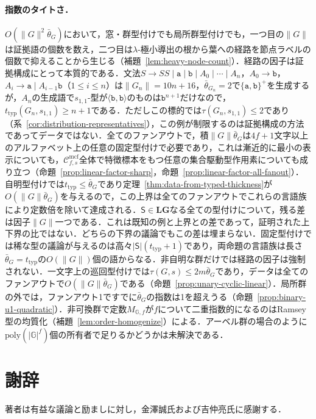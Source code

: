 \documentclass[11pt,a4paper]{ltjsarticle}
\numberwithin{equation}{section}
\theoremstyle{plain}
\theoremstyle{definition}
\theoremstyle{remark}
\newcommand{\Cmcf}[2]{\mathcal{C}^{\mathrm{mcf}}_{#1,#2}}
\begin{document}
\paragraph{指数のタイトさ．}
$O(\|G\|^2\bar\theta_G)$において，窓・群型付けでも局所群型付けでも，一つ目の$\|G\|$は証拠語の個数を数え，二つ目は$\lambda$-極小導出の根から葉への経路を節点ラベルの個数で抑えることから生じる（補題~\ref{lem:heavy-node-count}）．経路の因子は証拠構成にとって本質的である．文法$S\to SS\mid\mathtt a\mid\mathtt b\mid A_0\mid\cdots\mid A_n$，$A_0\to\mathtt b$，$A_i\to\mathtt a\mid A_{i-1}\mathtt b$（$1\le i\le n$）は$\|G_n\|=10n+16$，$\bar\theta_{G_n}=2$で$\{\mathtt a,\mathtt b\}^+$を生成するが，$A_n$の生成語で$s_{1,1}$-型が$\langle\mathtt b,\mathtt b\rangle$のものは$\mathtt b^{n+1}$だけなので，$t_{\mathrm{typ}}(G_n,s_{1,1})\ge n+1$である．ただしこの標的では$\tau(G_n,s_{1,1})\le2$であり（系~\ref{cor:distribution-representatives}），この例が制限するのは証拠構成の方法であってデータではない．全てのファンアウトで，積$\|G\|\bar\theta_G$は$4f+1$文字以上のアルファベット上の任意の固定型付けで必要であり，これは漸近的に最小の表示についても，$\Cmcf{f}{s}$全体で特徴標本をもつ任意の集合駆動型作用素についても成り立つ（命題~\ref{prop:linear-factor-sharp}，命題~\ref{prop:linear-factor-all-fanout}）．自明型付けでは$t_{\mathrm{typ}}\le\bar\theta_G$であり定理~\ref{thm:data-from-typed-thickness}が$O(\|G\|\bar\theta_G)$を与えるので，この上界は全てのファンアウトでこれらの言語族により定数倍を除いて達成される．$\mathsf S\in\mathbf{LG}$なる全ての型付けについて，残る差は因子$\|G\|$一つである．これは既知の例と上界との差であって，証明された上下界の比ではない．どちらの下界の議論でもこの差は埋まらない．固定型付けでは稀な型の議論が与えるのは高々$|\mathsf S|(t_{\mathrm{typ}}+1)$であり，両命題の言語族は長さ$\bar\theta_G=t_{\mathrm{typ}}$の$O(\|G\|)$個の語からなる．非自明な群だけでは経路の因子は強制されない．一文字上の巡回型付けでは$\tau(G,s)\le2m\bar\theta_G$であり，データは全てのファンアウトで$O(\|G\|\bar\theta_G)$である（命題~\ref{prop:unary-cyclic-linear}）．局所群の外では，ファンアウト1ですでに$\bar\theta_G$の指数は1を超えうる（命題~\ref{prop:binary-u1-quadratic}）．非可換群で定数$M_{\mathbb G,f}$が$f$について二重指数的になるのはRamsey型の均質化（補題~\ref{lem:order-homogenize}）による．アーベル群の場合のように$\mathrm{poly}(|\mathbb G|^f)$個の所有者で足りるかどうかは未解決である．

\section*{謝辞}
著者は有益な議論と励ましに対し，金澤誠氏および吉仲亮氏に感謝する．
\end{document}
